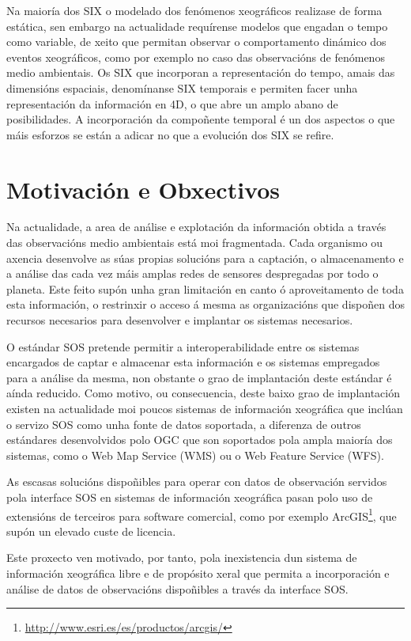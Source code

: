 Na maioría dos SIX o modelado dos fenómenos xeográficos realizase de forma estática, sen embargo na actualidade requírense modelos que engadan o tempo como variable, de xeito que permitan observar o comportamento dinámico dos eventos xeográficos, como por exemplo no caso das observacións de fenómenos medio ambientais. Os SIX que incorporan a representación do tempo, amais das dimensións espaciais, denomínanse SIX temporais e permiten facer unha representación da información en 4D, o que abre un amplo abano de posibilidades. A incorporación da compoñente temporal é un dos aspectos o que máis esforzos se están a adicar no que a evolución dos SIX se refire.

\section{Motivación e Obxectivos}

Na actualidade, a area de análise e explotación da información obtida a través das observacións medio ambientais está moi fragmentada. Cada organismo ou axencia desenvolve as súas propias solucións para a captación, o almacenamento e a análise das cada vez máis amplas redes de sensores despregadas por todo o planeta. Este feito supón unha gran limitación en canto ó aproveitamento de toda esta información, o restrinxir o acceso á mesma as organizacións que dispoñen dos recursos necesarios para desenvolver e implantar os sistemas necesarios.

O estándar SOS pretende permitir a interoperabilidade entre os sistemas encargados de captar e almacenar esta información e os sistemas empregados para a análise da mesma, non obstante o grao de implantación deste estándar é aínda reducido. Como motivo, ou consecuencia, deste baixo grao de implantación existen na actualidade moi poucos sistemas de información xeográfica que inclúan o servizo SOS como unha fonte de datos soportada, a diferenza de outros estándares desenvolvidos polo OGC que son soportados pola ampla maioría dos sistemas, como o Web Map Service (WMS) ou o Web Feature Service (WFS).

As escasas solucións dispoñibles para operar con datos de observación servidos pola interface SOS en sistemas de información xeográfica pasan polo uso de extensións de terceiros para software comercial, como por exemplo ArcGIS\footnote{\url{http://www.esri.es/es/productos/arcgis/}}, que supón un elevado custe de licencia.

Este proxecto ven motivado, por tanto, pola inexistencia dun sistema de información xeográfica libre e de propósito xeral que permita a incorporación e análise de datos de observacións dispoñibles a través da interface SOS.


